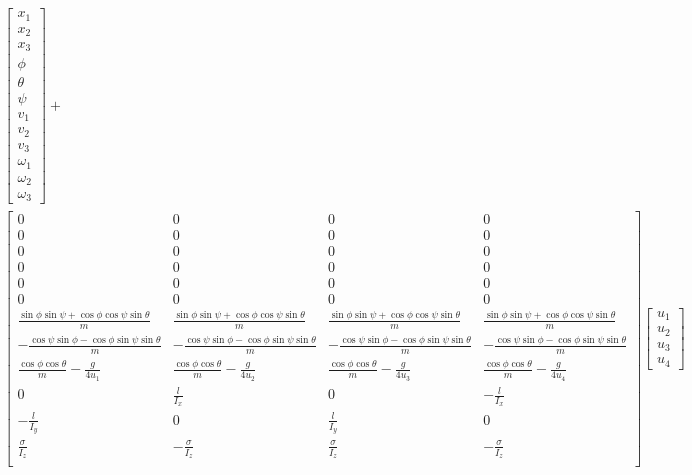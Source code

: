 \documentclass{article}
\begin{document}
\begin{equation}
\begin{aligned}
        \begin{bmatrix}
            x_1 \\ x_2 \\ x_3 \\ \phi \\ \theta \\ \psi \\
            v_1 \\ v_2 \\ v_3 \\ \omega_1 \\ \omega_2 \\ \omega_3
        \end{bmatrix}
        + \\
        \begin{bmatrix}
            0 & 0 & 0 & 0 \\
            0 & 0 & 0 & 0 \\
            0 & 0 & 0 & 0 \\
            0 & 0 & 0 & 0 \\
            0 & 0 & 0 & 0 \\
            0 & 0 & 0 & 0 \\
            \frac{\sin{\phi}\sin{\psi}+\cos{\phi}\cos{\psi}\sin{\theta}}{m} & \frac{\sin{\phi}\sin{\psi}+\cos{\phi}\cos{\psi}\sin{\theta}}{m} & \frac{\sin{\phi}\sin{\psi}+\cos{\phi}\cos{\psi}\sin{\theta}}{m} & \frac{\sin{\phi}\sin{\psi}+\cos{\phi}\cos{\psi}\sin{\theta}}{m} \\
            -\frac{\cos{\psi}\sin{\phi}-\cos{\phi}\sin{\psi}\sin{\theta}}{m} & -\frac{\cos{\psi}\sin{\phi}-\cos{\phi}\sin{\psi}\sin{\theta}}{m} & -\frac{\cos{\psi}\sin{\phi}-\cos{\phi}\sin{\psi}\sin{\theta}}{m} & -\frac{\cos{\psi}\sin{\phi}-\cos{\phi}\sin{\psi}\sin{\theta}}{m} \\
            \frac{\cos{\phi}\cos{\theta}}{m}-\frac{g}{4u_1} & \frac{\cos{\phi}\cos{\theta}}{m}-\frac{g}{4u_2} & \frac{\cos{\phi}\cos{\theta}}{m}-\frac{g}{4u_3} & \frac{\cos{\phi}\cos{\theta}}{m}-\frac{g}{4u_4} \\
            0 & \frac{l}{I_x} & 0 & -\frac{l}{I_x} \\
            -\frac{l}{I_y} & 0 & \frac{l}{I_y} & 0 \\
            \frac{\sigma}{I_z} & -\frac{\sigma}{I_z} & \frac{\sigma}{I_z} & -\frac{\sigma}{I_z} \\
        \end{bmatrix}
        \begin{bmatrix}
            u_1 \\ u_2 \\ u_3 \\ u_4
        \end{bmatrix}
    \end{aligned}
\end{equation}
\end{document}
